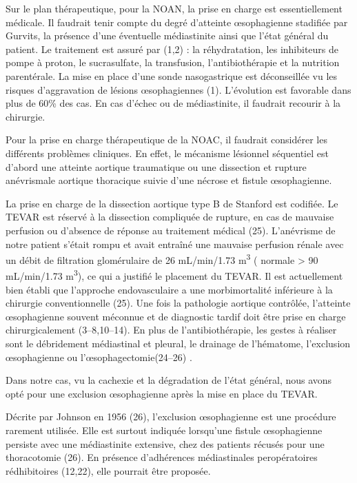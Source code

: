 \documentclass[./tfe.tex]{subfiles}
\begin{document}
Sur le plan thérapeutique, pour la NOAN, la prise en charge est essentiellement médicale. Il faudrait tenir compte du degré d’atteinte œsophagienne stadifiée par Gurvits, la présence d’une éventuelle médiastinite ainsi que l’état général du patient. Le traitement est assuré par (1,2) : la réhydratation, les inhibiteurs de pompe à proton, le sucrasulfate, la transfusion, l’antibiothérapie et la nutrition parentérale. La mise en place d’une sonde nasogastrique est déconseillée vu les risques d’aggravation de lésions œsophagiennes (1). L’évolution est favorable dans plus de 60\% des cas. En cas d’échec ou de médiastinite, il faudrait recourir à la chirurgie.

Pour la prise en charge thérapeutique de la NOAC, il faudrait considérer les différents problèmes cliniques. En effet, le mécanisme lésionnel séquentiel est d’abord une atteinte aortique traumatique ou une dissection et rupture anévrismale aortique thoracique suivie d’une nécrose et fistule œsophagienne.

La prise en charge de la dissection aortique type B de Stanford est codifiée. Le TEVAR est réservé à la dissection compliquée de rupture, en cas de mauvaise perfusion ou d’absence de réponse au traitement médical (25). L’anévrisme de notre patient s’était rompu et avait entraîné une mauvaise perfusion rénale avec un débit de filtration glomérulaire de 26 mL/min/1.73 \si{\meter\cubed} ( normale > 90 mL/min/1.73 \si{\meter\cubed}), ce qui a justifié le placement du TEVAR. Il est actuellement bien établi que l’approche endovasculaire a une morbimortalité inférieure à la chirurgie conventionnelle (25). 
Une fois la pathologie aortique contrôlée, l’atteinte œsophagienne souvent méconnue et de diagnostic tardif doit être prise en charge chirurgicalement (3–8,10–14). En plus de l’antibiothérapie, les gestes à réaliser sont le débridement médiastinal et pleural, le drainage de l’hématome, l’exclusion œsophagienne ou l’œsophagectomie(24–26) .

Dans notre cas, vu la cachexie et la dégradation de l’état général, nous avons opté pour une exclusion œsophagienne après la mise en place du TEVAR.

Décrite par Johnson en 1956 (26), l’exclusion œsophagienne est une procédure rarement utilisée. Elle est surtout indiquée lorsqu’une fistule œsophagienne persiste avec une médiastinite extensive, chez des patients récusés pour une thoracotomie (26). En présence d’adhérences médiastinales peropératoires rédhibitoires (12,22), elle pourrait être proposée.
\end{document}
